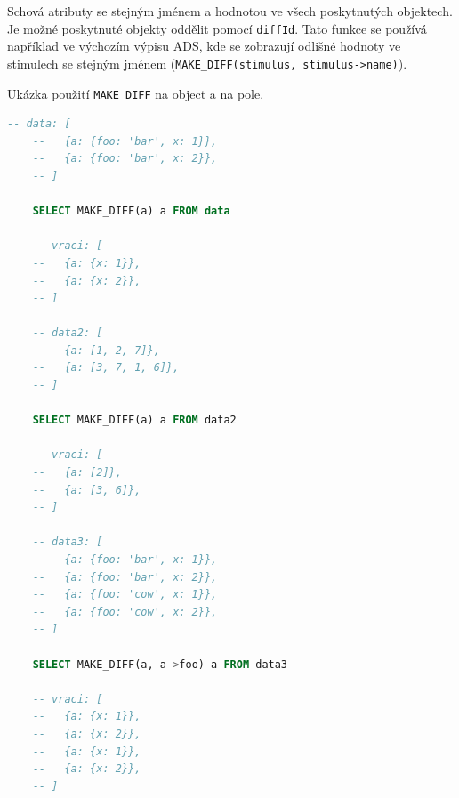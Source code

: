 Schová atributy se stejným jménem a hodnotou ve všech poskytnutých objektech. Je možné poskytnuté objekty oddělit pomocí \lstinline|diffId|. Tato funkce se používá například ve výchozím výpisu ADS, kde se zobrazují odlišné hodnoty ve stimulech se stejným jménem (\lstinline|MAKE_DIFF(stimulus, stimulus->name)|).

\begin{exmp}
  Ukázka použití \/\lstinline|MAKE_DIFF| na object a na pole.

  \begin{lstlisting}[language=SQL]
    -- data: [
    --   {a: {foo: 'bar', x: 1}},
    --   {a: {foo: 'bar', x: 2}},
    -- ]

    SELECT MAKE_DIFF(a) a FROM data

    -- vraci: [
    --   {a: {x: 1}},
    --   {a: {x: 2}},
    -- ]

    -- data2: [
    --   {a: [1, 2, 7]},
    --   {a: [3, 7, 1, 6]},
    -- ]

    SELECT MAKE_DIFF(a) a FROM data2

    -- vraci: [
    --   {a: [2]},
    --   {a: [3, 6]},
    -- ]

    -- data3: [
    --   {a: {foo: 'bar', x: 1}},
    --   {a: {foo: 'bar', x: 2}},
    --   {a: {foo: 'cow', x: 1}},
    --   {a: {foo: 'cow', x: 2}},
    -- ]

    SELECT MAKE_DIFF(a, a->foo) a FROM data3

    -- vraci: [
    --   {a: {x: 1}},
    --   {a: {x: 2}},
    --   {a: {x: 1}},
    --   {a: {x: 2}},
    -- ]
  \end{lstlisting}
\end{exmp}
